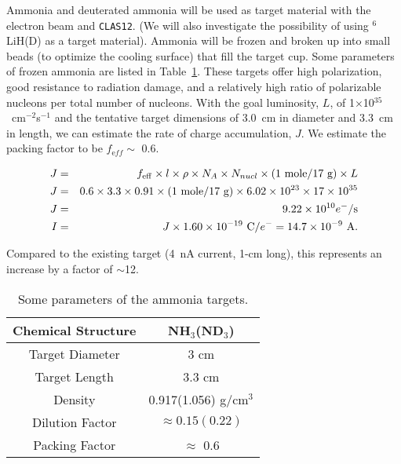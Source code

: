Ammonia and deuterated ammonia will be used as target material with the 
electron beam and {\tt CLAS12}. (We will also investigate the possibility of 
using $^6$LiH(D) as a target material). Ammonia will be frozen and broken up 
into small beads (to optimize the cooling surface) that fill the target cup.
Some parameters of frozen ammonia are listed in Table~\ref{ammo}.  These 
targets offer high polarization, good resistance to radiation damage, and a 
relatively high ratio of polarizable nucleons per total number of nucleons. 
With the goal luminosity, $L$, of 1$\times$10$^{35}$~cm$^{-2}$s$^{-1}$ and the 
tentative target dimensions of 3.0~cm in diameter and 3.3~cm in length, we can 
estimate the rate of charge accumulation, $J$.  We estimate the packing factor 
to be $f_{\mathrm eff} \sim$ 0.6.

\begin{eqnarray}
J &=& f_{\rm eff}\times l \times \rho \times N_A \times N_{nucl} \times 
(1~{\rm mole}/17~{\rm g}) \times L\\ \nonumber
J &=& 0.6 \times 3.3 \times 0.91 \times  (1~{\rm mole}/17~{\rm g}) \times 
6.02\times 10^{23} \times 17 \times 10^{35}\\ \nonumber
J &=& 9.22 \times 10^{10} e^-/{\rm s} \\ \nonumber
I &=& J\times 1.60 \times 10^{-19}~{\rm C}/e^- = 14.7 \times 10^{-9}~{\rm A}.
\end{eqnarray}

\noindent
Compared to the existing target (4~nA current, 1-cm long), this represents 
an increase by a factor of $\sim$12. 

\begin{table}[hbt]
\begin{center}
\begin{tabular}{|c|c|} \hline
Chemical Structure  & NH$_3$(ND$_3$)   \\ \hline
Target Diameter     & 3 cm \\ \hline
Target Length       & 3.3 cm \\ \hline
Density             & 0.917(1.056) g/cm$^3$ \\ \hline
Dilution Factor     & $\approx 0.15 (0.22)$ \\ \hline
Packing Factor      & $\approx$ 0.6 \\ \hline
\end{tabular}
\end{center}
\caption{\small{Some parameters of the ammonia targets.}}
\label{ammo}
\end{table}

